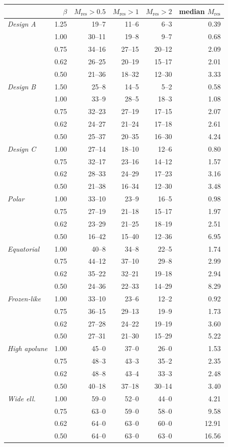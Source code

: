 \begin{tabular}{@{}l r r r r r@{}}
\toprule
& $\beta$ & $M_{\mathrm{res}}>0.5$ & $M_{\mathrm{res}}>1$ & $M_{\mathrm{res}}>2$ & median $M_{\mathrm{res}}$ \\
\midrule
\emph{Design A} & 1.25 & 19--7 & 11--6 & 6--3 & 0.39 \\
 & 1.00 & 30--11 & 19--8 & 9--7 & 0.68 \\
 & 0.75 & 34--16 & 27--15 & 20--12 & 2.09 \\
 & 0.62 & 26--25 & 20--19 & 15--17 & 2.01 \\
 & 0.50 & 21--36 & 18--32 & 12--30 & 3.33 \\
\midrule
\emph{Design B} & 1.50 & 25--8 & 14--5 & 5--2 & 0.58 \\
 & 1.00 & 33--9 & 28--5 & 18--3 & 1.08 \\
 & 0.75 & 32--23 & 27--19 & 17--15 & 2.07 \\
 & 0.62 & 24--27 & 21--24 & 17--18 & 2.61 \\
 & 0.50 & 25--37 & 20--35 & 16--30 & 4.24 \\
\midrule
\emph{Design C} & 1.00 & 27--14 & 18--10 & 12--6 & 0.80 \\
 & 0.75 & 32--17 & 23--16 & 14--12 & 1.57 \\
 & 0.62 & 28--33 & 24--29 & 17--23 & 3.16 \\
 & 0.50 & 21--38 & 16--34 & 12--30 & 3.48 \\
\midrule
\emph{Polar} & 1.00 & 33--10 & 23--9 & 16--5 & 0.98 \\
 & 0.75 & 27--19 & 21--18 & 15--17 & 1.97 \\
 & 0.62 & 23--29 & 21--25 & 18--19 & 2.51 \\
 & 0.50 & 16--42 & 15--40 & 12--36 & 6.95 \\
\midrule
\emph{Equatorial} & 1.00 & 40--8 & 34--8 & 22--5 & 1.74 \\
 & 0.75 & 44--12 & 37--10 & 29--8 & 2.99 \\
 & 0.62 & 35--22 & 32--21 & 19--18 & 2.94 \\
 & 0.50 & 24--36 & 22--33 & 14--29 & 8.29 \\
\midrule
\emph{Frozen-like} & 1.00 & 33--10 & 23--6 & 12--2 & 0.92 \\
 & 0.75 & 36--15 & 29--13 & 19--9 & 1.73 \\
 & 0.62 & 27--28 & 24--22 & 19--19 & 3.60 \\
 & 0.50 & 27--31 & 21--30 & 15--29 & 5.22 \\
\midrule
\emph{High apolune} & 1.00 & 45--0 & 37--0 & 26--0 & 1.53 \\
 & 0.75 & 48--3 & 43--3 & 35--2 & 2.35 \\
 & 0.62 & 48--8 & 43--4 & 33--3 & 2.48 \\
 & 0.50 & 40--18 & 37--18 & 30--14 & 3.40 \\
\midrule
\emph{Wide ell.} & 1.00 & 59--0 & 52--0 & 44--0 & 4.21 \\
 & 0.75 & 63--0 & 59--0 & 58--0 & 9.58 \\
 & 0.62 & 64--0 & 63--0 & 60--0 & 12.91 \\
 & 0.50 & 64--0 & 63--0 & 63--0 & 16.56 \\
\bottomrule
\end{tabular}
